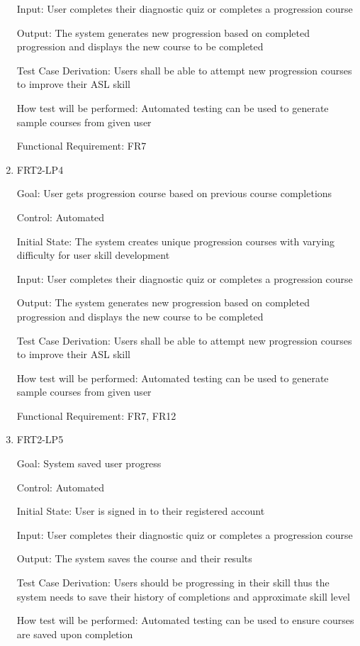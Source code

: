 \documentclass[12pt, titlepage]{article}
\begin{document}
\begin{enumerate}
Input: User completes their diagnostic quiz or completes a progression course
					
Output: The system generates new progression based on completed progression and displays the new course to be completed

Test Case Derivation: Users shall be able to attempt new progression courses to improve their ASL skill
					
How test will be performed: Automated testing can be used to generate sample courses from given user

Functional Requirement: FR7

\item{FRT2-LP4}

Goal: User gets progression course based on previous course completions

Control: Automated
					
Initial State: The system creates unique progression courses with varying difficulty for user skill development
					
Input: User completes their diagnostic quiz or completes a progression course
					
Output: The system generates new progression based on completed progression and displays the new course to be completed

Test Case Derivation: Users shall be able to attempt new progression courses to improve their ASL skill
					
How test will be performed: Automated testing can be used to generate sample courses from given user

Functional Requirement: FR7, FR12

\item{FRT2-LP5}

Goal: System saved user progress

Control: Automated
					
Initial State: User is signed in to their registered account

Input: User completes their diagnostic quiz or completes a progression course
					
Output: The system saves the course and their results

Test Case Derivation: Users should be progressing in their skill thus the system needs to save their history of completions and approximate skill level
					
How test will be performed: Automated testing can be used to ensure courses are saved upon completion


\end{enumerate}
\end{document}
